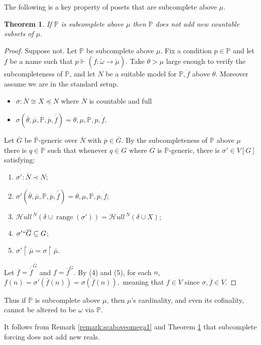 \documentclass{amsart}
\newtheorem{theorem}{Theorem}[section]
\theoremstyle{definition}
\theoremstyle{remark}
\renewcommand{\P}{\mathbb{P}}
\newcommand{\N}{{\overline{N}}}
\newcommand{\G}{\overline{G}}
\DeclareMathOperator{\ran}{range}
\newcommand{\forces}{\Vdash}
\newcommand{\rest}{\mathbin{\upharpoonright}}
\newcommand{\SH}{\mathcal{H}\textit{ull} \,}
\newcommand{\sk}[3]{\SH^{#1}( {#2} \cup {\ran(#3)} ) }
\newcommand{\Sk}[3]{\SH^{#1}( {#2} \cup {#3} ) }
\begin{document}
The following is a key property of posets that are subcomplete above \(\mu\).
\begin{theorem} \label{thm:nonewctblesubsetsofmu} If $\P$ is subcomplete above $\mu$ then $\P$ does not add new countable subsets of $\mu$. \end{theorem}
\begin{proof}
Suppose not. Let $\P$ be subcomplete above $\mu$. 
Fix a condition \(p\in\P\) and let $\dot{f}$ be a name such that
	$p \forces \left( \dot f: \check \omega \to \check{\mu} \right).$
Take $\theta > \mu$ large enough to verify the subcompleteness of $\P$, and let $N$ be a suitable model for $\P, \dot f$ above $\theta$. Moreover assume we are in the standard setup.
\begin{itemize}
	\item $\sigma: \N \cong X \preccurlyeq N$ where $\N$ is countable and full
	\item $\sigma(\overline \theta, \overline \mu, \overline{\P}, \overline p, \overline{\dot f})=\theta, \mu, \P, p, \dot f$.
\end{itemize}
Let $\G$ be $\overline{\P}$-generic over $\N$ with $\overline p \in \overline G$. By the subcompleteness of $\P$ above $\mu$ there is $q \in \P$ such that whenever $q \in G$ where $G$ is $\P$-generic, there is $\sigma' \in V[G]$ satisfying: \begin{enumerate}
	\item $\sigma': \N \prec N$;
	\item $\sigma'(\overline \theta, \overline \mu, \overline{\P}, \overline p, \overline{\dot f})=\theta, \mu, \P, p, \dot f$;
	\item $\sk{N}{\delta}{\sigma'} = \Sk{N}{\delta}{X}$;
	\item $\sigma'``\G \subseteq G$;
	\item $\sigma' \rest \overline \mu = \sigma \rest \overline \mu$.
\end{enumerate}
Let $\overline f = \overline{\dot f}^{\G}$ and $f = \dot f^G$. By (4) and (5), for each $n$, $f(n)=\sigma'(\overline f(n)) = \sigma(\overline f(n)),$ meaning that $f \in V$ since $\sigma,\overline{f} \in V$.
\end{proof}
Thus if $\P$ is subcomplete above $\mu$, then $\mu$'s cardinality, and even its cofinality, cannot be altered to be $\omega$ via $\P$.

It follows from Remark \ref{remark:scaboveomega1} and Theorem \ref{thm:nonewctblesubsetsofmu} that subcomplete forcing does not add new reals.
\end{document}
